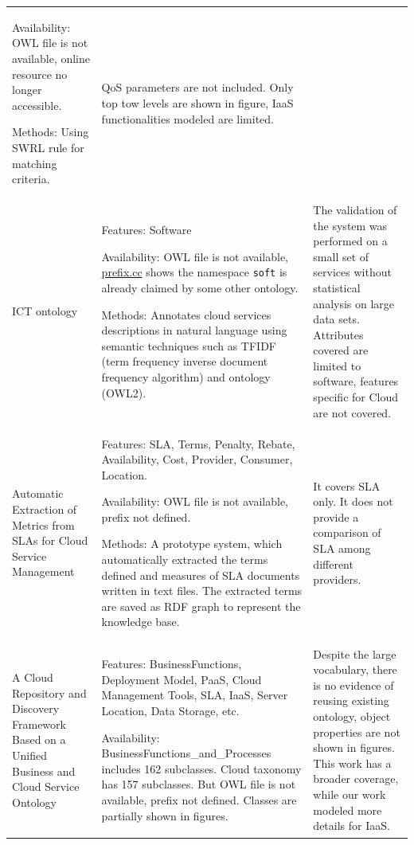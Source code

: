 \begin{longtable}[ht]{ p{.2\linewidth} p{.35\linewidth} p{.35\linewidth} }
    	Availability: OWL file is not available, online resource no longer accessible.
    	\bigskip
    	
    	Methods:
    	Using SWRL \cite{SWRL} rule for matching criteria.
        &
        QoS parameters are not included. Only top tow levels are shown in figure, IaaS functionalities modeled are limited.
        \\
        ICT ontology \cite{Ontology-basedAnnotationRetrievalOfServicesInCloud}
        &
        Features: Software  
    	\bigskip
    	
    	Availability: OWL file is not available, \url{prefix.cc} shows the namespace \texttt{soft} is already claimed by some other ontology.
    	\bigskip
    	
    	Methods:
        Annotates cloud services descriptions in natural language using semantic techniques such as TFIDF (term frequency inverse document frequency algorithm) and ontology (OWL2).
        &
        The validation of the system was performed on a small set of services without statistical analysis on large data sets.
        Attributes covered are limited to software, features specific for Cloud are not covered.
        \\
    	Automatic Extraction of Metrics from SLAs for Cloud Service Management \cite{AutoExtractionSLA}
    	&
    	Features: SLA, Terms, Penalty, Rebate, Availability, Cost, Provider, Consumer, Location.
    	\bigskip
    	
    	Availability: OWL file is not available, prefix not defined.
    	\bigskip
    	
    	Methods:
        A prototype system, which automatically extracted the terms defined and measures of SLA documents written in text files. The extracted terms are saved as RDF graph to represent the knowledge base.
        &
        It covers SLA only. It does not provide a comparison of SLA among different providers.
        \\
    	A Cloud Repository and Discovery Framework Based on a Unified Business and Cloud Service Ontology \cite{CloudRepositoryDiscoveryFrameworkBasedonOntology}
    	&
    	Features: BusinessFunctions, Deployment Model, PaaS, Cloud Management Tools, SLA, IaaS, Server Location, Data Storage, etc.
    	\bigskip
    	
    	Availability: BusinessFunctions\_and\_Processes includes 162 subclasses. Cloud taxonomy has 157 subclasses. But OWL file is not available, prefix not defined. Classes are partially shown in figures.
        &
        Despite the large vocabulary, there is no evidence of reusing existing ontology, object properties are not shown in figures. This work has a broader coverage, while our work modeled more details for IaaS.
        \\
    \bottomrule
\end{longtable}

